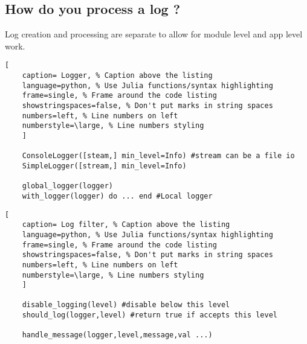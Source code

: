 \documentclass[11pt]{scrartcl} %
\begin{document}
\subsection{How do you process a log ?}

Log creation and processing are separate to allow for module level
and app level work.

\begin{lstlisting}[
	caption= Logger, % Caption above the listing
	language=python, % Use Julia functions/syntax highlighting
	frame=single, % Frame around the code listing
	showstringspaces=false, % Don't put marks in string spaces
	numbers=left, % Line numbers on left
	numberstyle=\large, % Line numbers styling
	]

	ConsoleLogger([steam,] min_level=Info) #stream can be a file io
	SimpleLogger([stream,] min_level=Info)

	global_logger(logger)
	with_logger(logger) do ... end #Local logger

\end{lstlisting}


\begin{lstlisting}[
	caption= Log filter, % Caption above the listing
	language=python, % Use Julia functions/syntax highlighting
	frame=single, % Frame around the code listing
	showstringspaces=false, % Don't put marks in string spaces
	numbers=left, % Line numbers on left
	numberstyle=\large, % Line numbers styling
	]

	disable_logging(level) #disable below this level
	should_log(logger,level) #return true if accepts this level

	handle_message(logger,level,message,val ...)

\end{lstlisting}
\end{document}
